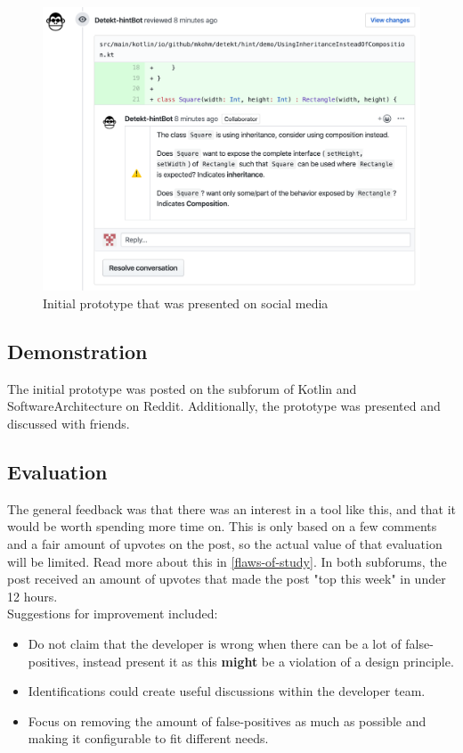 \documentclass{report}
\begin{document}
\begin{figure}[h!]
    \centering
    \includegraphics[width=\textwidth]{../images/demo.png}
    \caption{Initial prototype that was presented on social media}
    \label{fig:mockup}
\end{figure}

\subsection*{Demonstration}
The initial prototype was posted on the subforum of Kotlin\cite{kotlin-reddit} and SoftwareArchitecture\cite{softwarearch-reddit} on Reddit. Additionally, the prototype was presented and discussed with friends. 

\subsection*{Evaluation}
The general feedback was that there was an interest in a tool like this, and that it would be worth spending more time on. This is only based on a few comments and a fair amount of upvotes on the post, so the actual value of that evaluation will be limited. Read more about this in \ref{flaws-of-study}. In both subforums, the post received an amount of upvotes that made the post "top this week" in under 12 hours. \\

Suggestions for improvement included: 
\begin{itemize}
    \item Do not claim that the developer is wrong when there can be a lot of false-positives, instead present it as this \textbf{might} be a violation of a design principle.
    \item Identifications could create useful discussions within the developer team.
    \item Focus on removing the amount of false-positives as much as possible and making it configurable to fit different needs.
\end{itemize}
\end{document}
